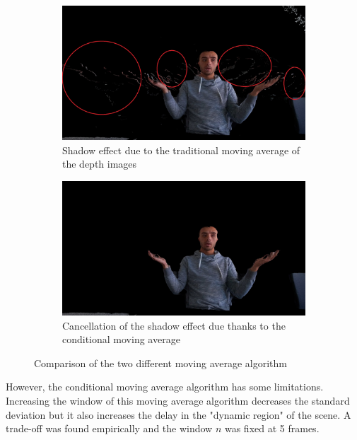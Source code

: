 \begin{figure}[H]
\centering
  \begin{subfigure}[b]{0.65 \textwidth}
    \includegraphics[width=\textwidth]{images/visual_enhancement/average_5_00541_red.jpg}
    \caption{Shadow effect due to the traditional moving average of the depth images}
    \label{figure:master_depth_frame_serie_moving_average}
  \end{subfigure}
  \hfill
  \begin{subfigure}[b]{0.65 \textwidth}
    \includegraphics[width=\textwidth]{images/visual_enhancement/average_5_00541_30mm.jpg}
    \caption{Cancellation of the shadow effect due thanks to the conditional moving average}
    \label{figure:average_5_00541_30mm}
  \end{subfigure}
  \caption{Comparison of the two different moving average algorithm}
  \label{figure:frame_serie_moving_avarage}
\end{figure}

However, the conditional moving average algorithm has some limitations. Increasing the window of this moving average algorithm decreases the standard deviation but it also increases the delay in the "dynamic region" of the scene. A trade-off was found empirically and the window $n$ was fixed at 5 frames.

